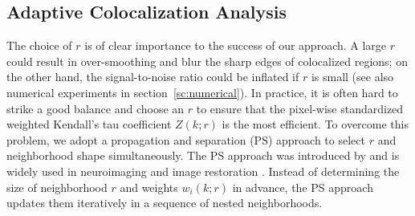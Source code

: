 \documentclass[10pt,twocolumn,twoside]{IEEEtran}
\begin{document}
\subsection{Adaptive Colocalization Analysis}
\label{sc:adpwt}

The choice of $r$ is of clear importance to the success of our approach. A large $r$ could result in over-smoothing and blur the sharp edges of colocalized regions; on the other hand, the signal-to-noise ratio could be inflated if $r$ is small (see also numerical experiments in section~\ref{sc:numerical}). In practice, it is often hard to strike a good balance and choose an $r$ to ensure that the pixel-wise standardized weighted Kendall's tau coefficient $Z(k;r)$ is the most efficient. To overcome this problem, we adopt a propagation and separation (PS) approach to select $r$ and neighborhood shape simultaneously. The PS approach was introduced by  \cite{Polzehl2000,Polzehl2006} and is widely used in neuroimaging and image restoration \citep[see][]{Li2011,Polzehl2000}. Instead of determining the size of neighborhood $r$ and weights $w_i(k;r)$ in advance, the PS approach updates them iteratively in a sequence of nested neighborhoods.  
\end{document}
